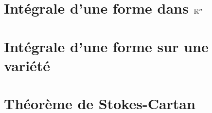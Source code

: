 \chapter{Intégrale d'une forme dans \( \mathbb{R}^n \)}
\chapter{Intégrale d'une forme sur une variété}
\chapter{Théorème de Stokes-Cartan}

